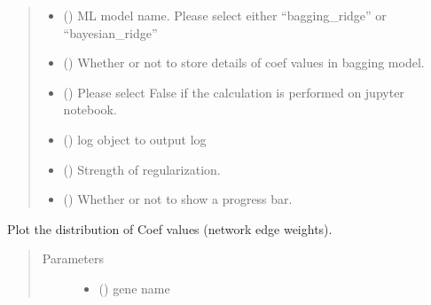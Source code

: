 \documentclass[letterpaper,10pt,english]{sphinxmanual}
\begin{document}
\begin{fulllineitems}
\begin{fulllineitems}
\begin{quote}
\begin{description}
\begin{itemize}
\item {} 
 () \textendash{} ML model name. Please select either “bagging\_ridge” or “bayesian\_ridge”

\item {} 
 () \textendash{} Whether or not to store details of coef values in bagging model.

\item {} 
 () \textendash{} Please select False if the calculation is performed on jupyter notebook.

\item {} 
 () \textendash{} log object to output log

\item {} 
 () \textendash{} Strength of regularization.

\item {} 
 () \textendash{} Whether or not to show a progress bar.

\end{itemize}

\end{description}\end{quote}

\end{fulllineitems}


\begin{fulllineitems}
\label{\detokenize{modules/celloracle:celloracle.Net.plotCoefs}}
Plot the distribution of Coef values (network edge weights).
\begin{quote}\begin{description}
\item[{Parameters}] \leavevmode\begin{itemize}
\item {} 
 () \textendash{} gene name


\end{itemize}
\end{description}
\end{quote}
\end{fulllineitems}
\end{fulllineitems}
\end{document}
